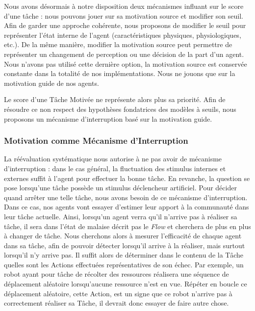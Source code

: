 			Nous avons désormais à notre disposition deux mécanismes influant sur le score d'une tâche : nous pouvons jouer sur sa motivation source et modifier son seuil. Afin de garder une approche cohérente, nous proposons de modifier le seuil pour représenter l'état interne de l'agent (caractéristiques physiques, physiologiques, etc.). De la même manière, modifier la motivation source peut permettre de représenter un changement de perception ou une décision de la part d'un agent. Nous n'avons pas utilisé cette dernière option, la motivation source est conservée constante dans la totalité de nos implémentations. Nous ne jouons que sur la motivation guide de nos agents.
			
			Le score d'une Tâche Motivée ne représente alors plus sa priorité. Afin de résoudre ce non respect des hypothèses fondatrices des modèles à seuils, nous proposons un mécanisme d'interruption basé sur la motivation guide.
			
		\subsubsection{Motivation comme Mécanisme d'Interruption}
		
			La réévaluation systématique nous autorise à ne pas avoir de mécanisme d'interruption : dans le cas général, la fluctuation des stimulus internes et externes suffit à l'agent pour effectuer la bonne tâche. En revanche, la question se pose lorsqu'une tâche possède un stimulus déclencheur artificiel. Pour décider quand arrêter une telle tâche, nous avons besoin de ce mécanisme d'interruption. Dans ce cas, nos agents vont essayer d'estimer leur apport à la communauté dans leur tâche actuelle. Ainsi, lorsqu'un agent verra qu'il n'arrive pas à réaliser sa tâche, il sera dans l'état de malaise décrit pas le \textit{Flow} et cherchera de plus en plus à changer de tâche. Nous cherchons alors à mesurer l'efficacité de chaque agent dans sa tâche, afin de pouvoir détecter lorsqu'il arrive à la réaliser, mais surtout lorsqu'il n'y arrive pas. Il suffit alors de déterminer dans le contenu de la Tâche quelles sont les Actions effectuées représentatives de son échec. Par exemple, un robot ayant pour tâche de récolter des ressources réalisera une séquence de déplacement aléatoire lorsqu'aucune ressource n'est en vue. Répéter en boucle ce déplacement aléatoire, cette Action, est un signe que ce robot n'arrive pas à correctement réaliser sa Tâche, il devrait donc essayer de faire autre chose.
			
